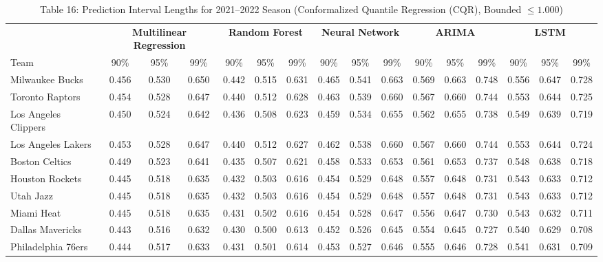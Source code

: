 \documentclass[11pt,a4paper]{article}
\begin{document}
\begin{table}[H]
\centering
\caption{Table 16: Prediction Interval Lengths for 2021--2022 Season (Conformalized Quantile Regression (CQR), Bounded $\le 1.000$)}
\label{tab:team_table16}
\tiny
\setlength{\tabcolsep}{1.5pt}
\begin{tabular}{l ccc ccc ccc ccc ccc}
\toprule
 & \multicolumn{3}{c}{\textbf{Multilinear Regression}} & \multicolumn{3}{c}{\textbf{Random Forest}} & \multicolumn{3}{c}{\textbf{Neural Network}} & \multicolumn{3}{c}{\textbf{ARIMA}} & \multicolumn{3}{c}{\textbf{LSTM}} \\
\cmidrule(lr){2-4} \cmidrule(lr){5-7} \cmidrule(lr){8-10} \cmidrule(lr){11-13} \cmidrule(lr){14-16}
Team & 90\% & 95\% & 99\% & 90\% & 95\% & 99\% & 90\% & 95\% & 99\% & 90\% & 95\% & 99\% & 90\% & 95\% & 99\% \\
\midrule
Milwaukee Bucks & 0.456 & 0.530 & 0.650 & 0.442 & 0.515 & 0.631 & 0.465 & 0.541 & 0.663 & 0.569 & 0.663 & 0.748 & 0.556 & 0.647 & 0.728 \\
Toronto Raptors & 0.454 & 0.528 & 0.647 & 0.440 & 0.512 & 0.628 & 0.463 & 0.539 & 0.660 & 0.567 & 0.660 & 0.744 & 0.553 & 0.644 & 0.725 \\
Los Angeles Clippers & 0.450 & 0.524 & 0.642 & 0.436 & 0.508 & 0.623 & 0.459 & 0.534 & 0.655 & 0.562 & 0.655 & 0.738 & 0.549 & 0.639 & 0.719 \\
Los Angeles Lakers & 0.453 & 0.528 & 0.647 & 0.440 & 0.512 & 0.627 & 0.462 & 0.538 & 0.660 & 0.567 & 0.660 & 0.744 & 0.553 & 0.644 & 0.724 \\
Boston Celtics & 0.449 & 0.523 & 0.641 & 0.435 & 0.507 & 0.621 & 0.458 & 0.533 & 0.653 & 0.561 & 0.653 & 0.737 & 0.548 & 0.638 & 0.718 \\
Houston Rockets & 0.445 & 0.518 & 0.635 & 0.432 & 0.503 & 0.616 & 0.454 & 0.529 & 0.648 & 0.557 & 0.648 & 0.731 & 0.543 & 0.633 & 0.712 \\
Utah Jazz & 0.445 & 0.518 & 0.635 & 0.432 & 0.503 & 0.616 & 0.454 & 0.529 & 0.648 & 0.557 & 0.648 & 0.731 & 0.543 & 0.633 & 0.712 \\
Miami Heat & 0.445 & 0.518 & 0.635 & 0.431 & 0.502 & 0.616 & 0.454 & 0.528 & 0.647 & 0.556 & 0.647 & 0.730 & 0.543 & 0.632 & 0.711 \\
Dallas Mavericks & 0.443 & 0.516 & 0.632 & 0.430 & 0.500 & 0.613 & 0.452 & 0.526 & 0.645 & 0.554 & 0.645 & 0.727 & 0.540 & 0.629 & 0.708 \\
Philadelphia 76ers & 0.444 & 0.517 & 0.633 & 0.431 & 0.501 & 0.614 & 0.453 & 0.527 & 0.646 & 0.555 & 0.646 & 0.728 & 0.541 & 0.631 & 0.709 \\

\end{tabular}
\end{table}
\end{document}
